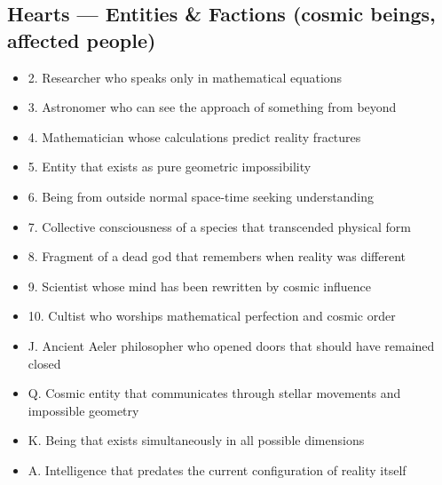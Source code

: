 \documentclass[11pt]{article}
\begin{document}
\subsection*{Hearts — Entities \& Factions (cosmic beings, affected people)}
\begin{itemize}[leftmargin=*]
\item 2. Researcher who speaks only in mathematical equations
\item 3. Astronomer who can see the approach of something from beyond
\item 4. Mathematician whose calculations predict reality fractures
\item 5. Entity that exists as pure geometric impossibility
\item 6. Being from outside normal space-time seeking understanding
\item 7. Collective consciousness of a species that transcended physical form
\item 8. Fragment of a dead god that remembers when reality was different
\item 9. Scientist whose mind has been rewritten by cosmic influence
\item 10. Cultist who worships mathematical perfection and cosmic order
\item J. Ancient Aeler philosopher who opened doors that should have remained closed
\item Q. Cosmic entity that communicates through stellar movements and impossible geometry
\item K. Being that exists simultaneously in all possible dimensions
\item A. Intelligence that predates the current configuration of reality itself
\end{itemize}
\end{document}
